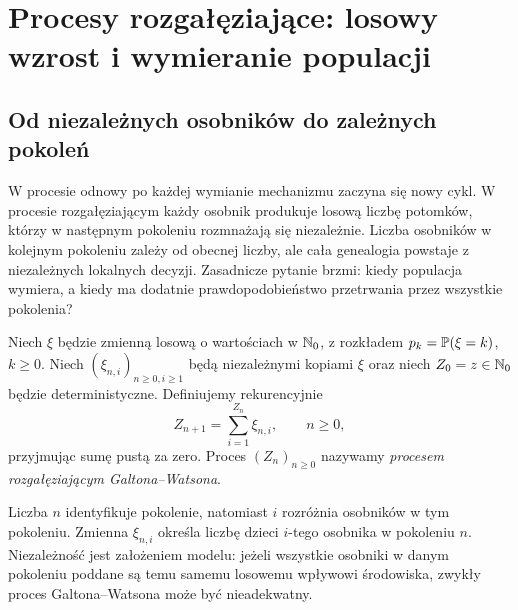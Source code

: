 \chapter{Procesy rozgałęziające: losowy wzrost i wymieranie populacji}
\label{ch:branching}

\section{Od niezależnych osobników do zależnych pokoleń}
W procesie odnowy po każdej wymianie mechanizmu zaczyna się nowy
cykl. W procesie rozgałęziającym każdy osobnik produkuje losową
liczbę potomków, którzy w następnym pokoleniu rozmnażają się niezależnie.
Liczba osobników w kolejnym pokoleniu zależy od obecnej liczby,
ale cała genealogia powstaje z niezależnych lokalnych decyzji.
Zasadnicze pytanie brzmi: kiedy populacja wymiera, a kiedy ma
dodatnie prawdopodobieństwo przetrwania przez wszystkie pokolenia?

\begin{definicja}
Niech $\xi$ będzie zmienną losową o wartościach w $\mathbb{N}_0$,
z rozkładem $p_k=\mathbb{P}(\xi=k)$, $k\ge0$.
Niech $(\xi_{n,i})_{n\ge0,i\ge1}$ będą niezależnymi kopiami
$\xi$ oraz niech $Z_0=z\in\mathbb{N}_0$ będzie deterministyczne.
Definiujemy rekurencyjnie
\[
Z_{n+1}=\sum_{i=1}^{Z_n}\xi_{n,i},\qquad n\ge0,
\]
przyjmując sumę pustą za zero. Proces $(Z_n)_{n\ge0}$
nazywamy \emph{procesem rozgałęziającym Galtona--Watsona}.
\end{definicja}

\begin{uwaga}
Liczba $n$ identyfikuje pokolenie, natomiast $i$ rozróżnia
osobników w tym pokoleniu. Zmienna $\xi_{n,i}$ określa liczbę
dzieci $i$-tego osobnika w pokoleniu $n$. Niezależność jest
założeniem modelu: jeżeli wszystkie osobniki w danym pokoleniu
poddane są temu samemu losowemu wpływowi środowiska, zwykły
proces Galtona--Watsona może być nieadekwatny.
\end{uwaga}


